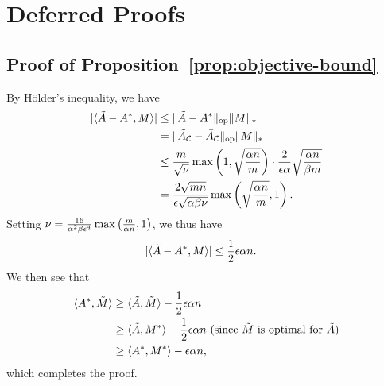 \section{Deferred Proofs}
\label{sec:proofs}

\subsection{Proof of Proposition~\ref{prop:objective-bound}}
\label{sec:objective-bounds-proof}

By H\"{o}lder's inequality, we have 
\begin{align}
|\langle \A-\Aa, M \rangle| &\leq \|\A-\Aa\|_{\op}\|M\|_* \\
 &= \|\A_{\sC}-\Aavg_{\sC}\|_{\op}\|M\|_* \\
 &\leq \frac{m}{\sqrt{\fac}}\max\p{1, \sqrt{\frac{\alpha n}{m}}} \cdot \frac{2}{\epsilon\alpha}\sqrt{\frac{\alpha n}{\beta m}} \\
 &= \frac{2\sqrt{mn}}{\epsilon\sqrt{\alpha\beta\fac}}\max\p{\sqrt{\frac{\alpha n}{m}}, 1}. %
\end{align}
Setting $\nu = \frac{16}{\alpha^2\beta\epsilon^4}\max\left( \frac{m}{\alpha n}, 1 \right)$, 
we thus have
\begin{align}
|\langle \tilde{A}-A^*, M \rangle| &\leq \frac{1}{2}\epsilon \alpha n.
\end{align}
We then see that
\begin{align}
\langle A^*, \tilde{M} \rangle  &\geq \langle \tilde{A}, \tilde{M} \rangle - \frac{1}{2}\epsilon \alpha n \\
 &\geq \langle \tilde{A}, M^* \rangle - \frac{1}{2} \epsilon \alpha n \text{ (since $\tilde{M}$ is optimal for $\tilde{A}$)} \\
 &\geq \langle A^*, M^* \rangle - \epsilon \alpha n,
\end{align}
which completes the proof.


